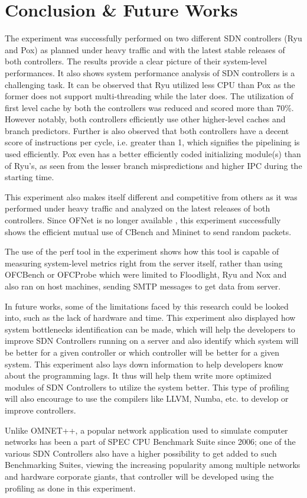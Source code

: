 \chapter{Conclusion \& Future Works} 

The experiment was successfully performed on two different SDN controllers (Ryu and Pox) as planned under heavy traffic and with the latest stable releases of both controllers. The results provide a clear picture of their system-level performances. It also shows system performance analysis of SDN controllers is a challenging task.  It can be observed that Ryu utilized less CPU than Pox as the former does not support multi-threading while the later does. The utilization of first level cache by both the controllers was reduced and scored more than 70\%. However notably, both controllers efficiently use other higher-level caches and branch predictors. Further is also observed that both controllers have a decent score of instructions per cycle, i.e. greater than 1, which signifies the pipelining is used efficiently. Pox even has a better efficiently coded initializing module(s) than of Ryu's, as seen from the lesser branch mispredictions and higher IPC during the starting time.

This experiment also makes itself different and competitive from others as it was performed under heavy traffic and analyzed on the latest releases of both controllers. Since OFNet is no longer available \cite{}, this experiment successfully shows the efficient mutual use of CBench and Mininet to send random packets.

The use of the perf tool in the experiment shows how this tool is capable of measuring system-level metrics right from the server itself, rather than using OFCBench or OFCProbe which were limited to Floodlight, Ryu and Nox and also ran on host machines, sending SMTP messages to get data from server.

In future works, some of the limitations faced by this research could be looked into, such as the lack of hardware and time. This experiment also displayed how system bottlenecks identification can be made, which will help the developers to improve SDN Controllers running on a server and also identify which system will be better for a given controller or which controller will be better for a given system. This experiment also lays down information to help developers know about the programming lags. It thus will help them write more optimized modules of SDN Controllers to utilize the system better. This type of profiling will also encourage to use the compilers like LLVM, Numba, etc. to develop or improve controllers.

Unlike OMNET++, a popular network application used to simulate computer networks has been a part of SPEC CPU Benchmark Suite since 2006; one of the various SDN Controllers also have a higher possibility to get added to such Benchmarking Suites, viewing the increasing popularity among multiple networks and hardware corporate giants, that controller will be developed using the profiling as done in this experiment.